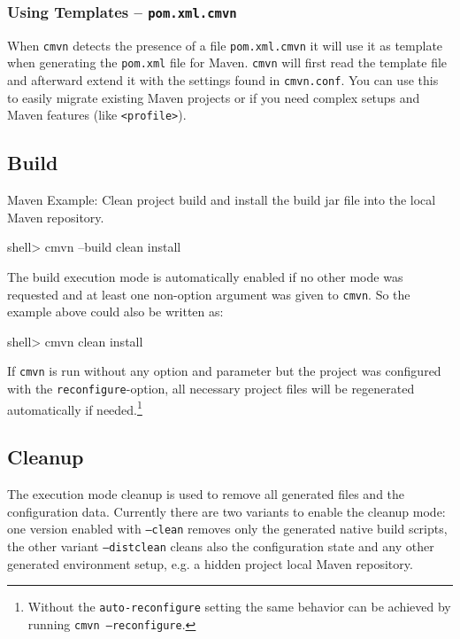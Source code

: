 \documentclass[a4paper,12pt,english,oneside,halfparskip]{scrartcl}
\newcommand{\CMVN}{\texttt{cmvn}}
\newcommand{\cmvn}{\texttt{cmvn}}
\newcommand{\code}[1]{\texttt{#1}}
\newcommand{\pom}{\code{pom.xml}}
\begin{document}
\subsubsection{Using Templates -- \code{pom.xml.cmvn}}

When \cmvn{} detects the presence of a file \code{pom.xml.cmvn} it will use it as template when generating the \pom{} file for Maven. \cmvn{} will first read the template file and afterward extend it with the settings found in \code{cmvn.conf}. You can use this to easily migrate existing Maven projects or if you need complex setups and Maven features (like \code{<profile>}). 


\subsection{Build}

Maven Example: Clean project build and install the build jar file into the local Maven repository.

\begin{Cmdline}
shell> cmvn --build clean install
\end{Cmdline}

The build execution mode is automatically enabled if no other mode was requested and at least one non-option argument was given to \CMVN{}. So the example above could also be written as:

\begin{Cmdline}
shell> cmvn clean install
\end{Cmdline}

If \cmvn{} is run without any option and parameter but the project was configured with the \code{reconfigure}-option, all necessary project files will be regenerated automatically if needed.\footnote{Without the \code{auto-reconfigure} setting the same behavior can be achieved by running \code{cmvn --reconfigure}.}



\subsection{Cleanup}

The execution mode cleanup is used to remove all generated files and the configuration data. Currently there are two variants to enable the cleanup mode: one version enabled with \code{--clean} removes only the generated native build scripts, the other variant \code{--distclean} cleans also the configuration state and any other generated environment setup, e.g. a hidden project local Maven repository.
\end{document}
